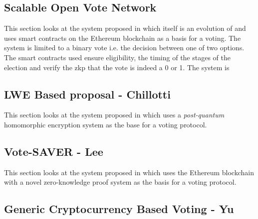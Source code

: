 \subsection{Scalable Open Vote Network}

This section looks at the system proposed in \cite{seifelnasrScalableOpenVoteNetwork2020} which itself is an evolution of \cite{mccorrySmartContractBoardroom2017} and uses smart contracts on the Ethereum blockchain as a basis for a voting. The system is limited to a binary vote i.e. the decision between one of two options. The smart contracts used ensure eligibility, the timing of the stages of the election and verify the \gls{zkp} that the vote is indeed a 0 or 1. The system is



\subsection{LWE Based proposal - Chillotti}

This section looks at the system proposed in \cite{chillottiHomomorphicLWEBased} which uses a \emph{post-quantum} homomorphic encryption system as the base for a voting protocol.


\subsection{Vote-SAVER - Lee}

This section looks at the system proposed in \cite{leeSAVERSNARKfriendlyAdditivelyhomomorphic2019} which uses the Ethereum blockchain with a novel zero-knowledge proof system as the basis for a voting protocol.


\subsection{Generic Cryptocurrency Based Voting - Yu}

